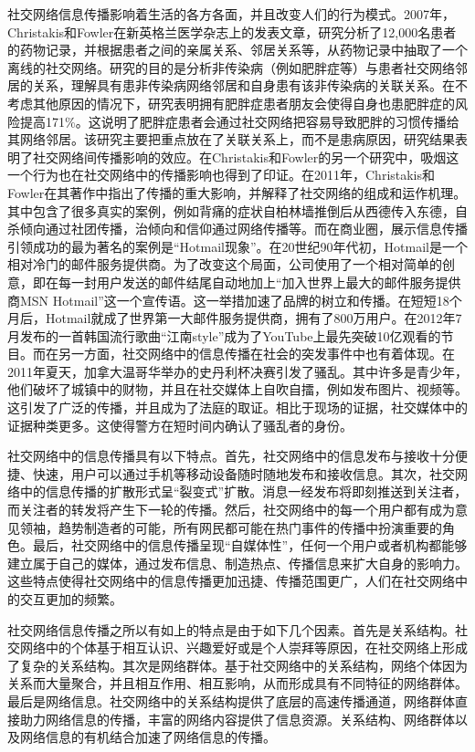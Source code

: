 社交网络信息传播影响着生活的各方各面，并且改变人们的行为模式。2007年，Christakis和Fowler在新英格兰医学杂志上的发表文章，研究分析了12,000名患者的药物记录，并根据患者之间的亲属关系、邻居关系等，从药物记录中抽取了一个离线的社交网络。研究的目的是分析非传染病（例如肥胖症等）与患者社交网络邻居的关系，理解具有患非传染病网络邻居和自身患有该非传染病的关联关系。在不考虑其他原因的情况下，研究表明拥有肥胖症患者朋友会使得自身也患肥胖症的风险提高171\%。这说明了肥胖症患者会通过社交网络把容易导致肥胖的习惯传播给其网络邻居。该研究主要把重点放在了关联关系上，而不是患病原因，研究结果表明了社交网络间传播影响的效应。在Christakis和Fowler的另一个研究中，吸烟这一个行为也在社交网络中的传播影响也得到了印证。在2011年，Christakis和Fowler在其著作中指出了传播的重大影响，并解释了社交网络的组成和运作机理。其中包含了很多真实的案例，例如背痛的症状自柏林墙推倒后从西德传入东德，自杀倾向通过社团传播，治倾向和信仰通过网络传播等。而在商业圈，展示信息传播引领成功的最为著名的案例是“Hotmail现象”。在20世纪90年代初，Hotmail是一个相对冷门的邮件服务提供商。为了改变这个局面，公司使用了一个相对简单的创意，即在每一封用户发送的邮件结尾自动地加上“加入世界上最大的邮件服务提供商MSN Hotmail”这一个宣传语。这一举措加速了品牌的树立和传播。在短短18个月后，Hotmail就成了世界第一大邮件服务提供商，拥有了800万用户。在2012年7月发布的一首韩国流行歌曲“江南style”成为了YouTube上最先突破10亿观看的节目。而在另一方面，社交网络中的信息传播在社会的突发事件中也有着体现。在2011年夏天，加拿大温哥华举办的史丹利杯决赛引发了骚乱。其中许多是青少年，他们破坏了城镇中的财物，并且在社交媒体上自吹自擂，例如发布图片、视频等。这引发了广泛的传播，并且成为了法庭的取证。相比于现场的证据，社交媒体中的证据种类更多。这使得警方在短时间内确认了骚乱者的身份。

社交网络中的信息传播具有以下特点。首先，社交网络中的信息发布与接收十分便捷、快速，用户可以通过手机等移动设备随时随地发布和接收信息。其次，社交网络中的信息传播的扩散形式呈“裂变式”扩散。消息一经发布将即刻推送到关注者，而关注者的转发将产生下一轮的传播。然后，社交网络中的每一个用户都有成为意见领袖，趋势制造者的可能，所有网民都可能在热门事件的传播中扮演重要的角色。最后，社交网络中的信息传播呈现“自媒体性”，任何一个用户或者机构都能够建立属于自己的媒体，通过发布信息、制造热点、传播信息来扩大自身的影响力。这些特点使得社交网络中的信息传播更加迅捷、传播范围更广，人们在社交网络中的交互更加的频繁。

社交网络信息传播之所以有如上的特点是由于如下几个因素。首先是关系结构。社交网络中的个体基于相互认识、兴趣爱好或是个人崇拜等原因，在社交网络上形成了复杂的关系结构。其次是网络群体。基于社交网络中的关系结构，网络个体因为关系而大量聚合，并且相互作用、相互影响，从而形成具有不同特征的网络群体。最后是网络信息。社交网络中的关系结构提供了底层的高速传播通道，网络群体直接助力网络信息的传播，丰富的网络内容提供了信息资源。关系结构、网络群体以及网络信息的有机结合加速了网络信息的传播。

